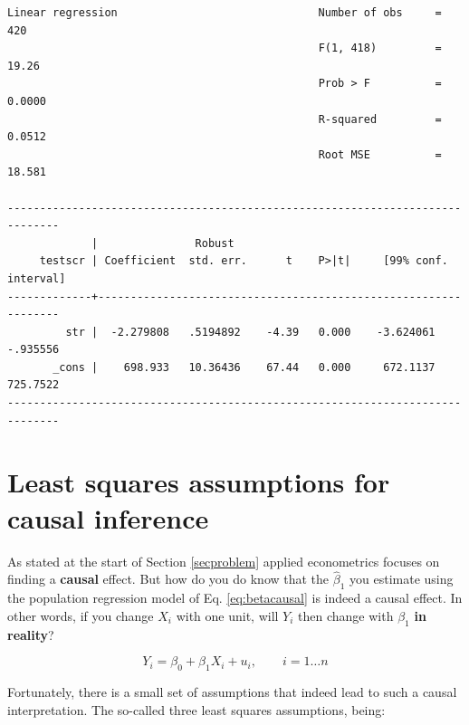 \documentclass[
]{book}
\begin{document}
\begin{verbatim}
Linear regression                               Number of obs     =        420
                                                F(1, 418)         =      19.26
                                                Prob > F          =     0.0000
                                                R-squared         =     0.0512
                                                Root MSE          =     18.581

------------------------------------------------------------------------------
             |               Robust
     testscr | Coefficient  std. err.      t    P>|t|     [99% conf. interval]
-------------+----------------------------------------------------------------
         str |  -2.279808   .5194892    -4.39   0.000    -3.624061    -.935556
       _cons |    698.933   10.36436    67.44   0.000     672.1137    725.7522
------------------------------------------------------------------------------
\end{verbatim}

\hypertarget{least-squares-assumptions-for-causal-inference}{%
\section{Least squares assumptions for causal inference}\label{least-squares-assumptions-for-causal-inference}}

As stated at the start of Section \ref{secproblem} applied econometrics focuses on finding a \textbf{causal} effect. But how do you do know that the \(\hat{\beta}_1\) you estimate using the population regression model of Eq. \eqref{eq:betacausal} is indeed a causal effect. In other words, if you change \(X_i\) with one unit, will \(Y_i\) then change with \(\beta_1\) \textbf{in reality}?

\begin{equation}
Y_i = \beta_0 + \beta_1 X_i + u_i, \qquad i = 1 \dots n
\label{eq:betacausal}
\end{equation}

Fortunately, there is a small set of assumptions that indeed lead to such a causal interpretation. The so-called three least squares assumptions, being:
\end{document}
